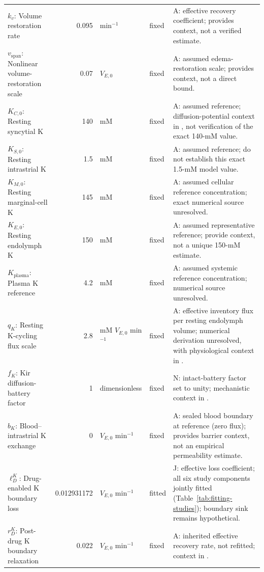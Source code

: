 \begin{longtable}{@{}>{\raggedright\arraybackslash}p{4.4cm}r>{\raggedright\arraybackslash}p{2.0cm}>{\raggedright\arraybackslash}p{1.0cm}>{\raggedright\arraybackslash}p{8.0cm}@{}}
\(k_v\): Volume restoration rate & 0.095 & min\(^{-1}\) & fixed & A: effective recovery coefficient; \citet{PikeBosher1980} provides context, not a verified estimate. \\
\(v_{\mathrm{span}}\): Nonlinear volume-restoration scale & 0.07 & \(V_{E,0}\) & fixed & A: assumed edema-restoration scale; \citet{SantiDuvall1979} provides context, not a direct bound. \\
\(K_{C,0}\): Resting syncytial K & 140 & mM & fixed & A: assumed reference; diffusion-potential context in \citet{Nin2008}, not verification of the exact 140-mM value. \\
\(K_{S,0}\): Resting intrastrial K & 1.5 & mM & fixed & A: assumed reference; \citet{Nin2008,Zhang2021} do not establish this exact 1.5-mM model value. \\
\(K_{M,0}\): Resting marginal-cell K & 145 & mM & fixed & A: assumed cellular reference concentration; exact numerical source unresolved. \\
\(K_{E,0}\): Resting endolymph K & 150 & mM & fixed & A: assumed representative reference; \citet{SaltKonishi1979,RybakMorizono1982} provide context, not a unique 150-mM estimate. \\
\(K_{\mathrm{plasma}}\): Plasma K reference & 4.2 & mM & fixed & A: assumed systemic reference concentration; numerical source unresolved. \\
\(q_K\): Resting K-cycling flux scale & 2.8 & mM \(V_{E,0}\) min\(^{-1}\) & fixed & A: effective inventory flux per resting endolymph volume; numerical derivation unresolved, with physiological context in \citet{Konishi1978,Nin2012}. \\
\(f_K\): Kir diffusion-battery factor & 1 & dimensionless & fixed & N: intact-battery factor set to unity; mechanistic context in \citet{Marcus2002,Nin2008}. \\
\(b_K\): Blood--intrastrial K exchange & 0 & \(V_{E,0}\) min\(^{-1}\) & fixed & A: sealed blood boundary at reference (zero flux); \citet{Shi2016} provides barrier context, not an empirical permeability estimate. \\
\(\ell_D^K\): Drug-enabled K boundary loss & 0.012931172 & \(V_{E,0}\) min\(^{-1}\) & fitted & J: effective loss coefficient; all six study components jointly fitted (Table~\ref{tab:fitting-studies}); boundary sink remains hypothetical. \\
\(r_D^K\): Post-drug K boundary relaxation & 0.022 & \(V_{E,0}\) min\(^{-1}\) & fixed & A: inherited effective recovery rate, not refitted; context in \citet{PikeBosher1980,RybakMorizono1982}. \\

\end{longtable}
